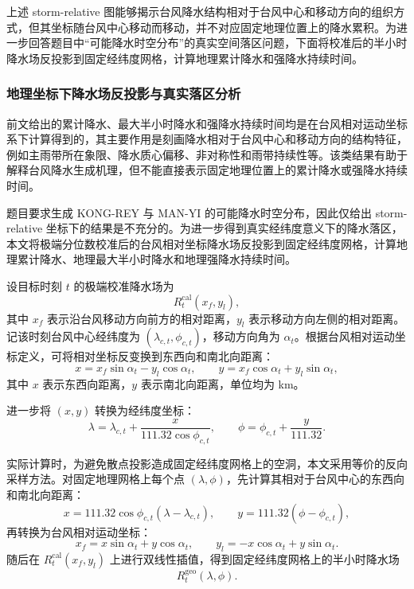 \documentclass[UTF8,a4paper,zihao=5]{ctexart}
\numberwithin{equation}{section}
\numberwithin{figure}{section}
\numberwithin{table}{section}
\begin{document}
上述 storm-relative 图能够揭示台风降水结构相对于台风中心和移动方向的组织方式，但其坐标随台风中心移动而移动，并不对应固定地理位置上的降水累积。为进一步回答题目中“可能降水时空分布”的真实空间落区问题，下面将校准后的半小时降水场反投影到固定经纬度网格，计算地理累计降水和强降水持续时间。

\subsubsection{地理坐标下降水场反投影与真实落区分析}

前文给出的累计降水、最大半小时降水和强降水持续时间均是在台风相对运动坐标系下计算得到的，其主要作用是刻画降水相对于台风中心和移动方向的结构特征，例如主雨带所在象限、降水质心偏移、非对称性和雨带持续性等。该类结果有助于解释台风降水生成机理，但不能直接表示固定地理位置上的累计降水或强降水持续时间。

题目要求生成 KONG-REY 与 MAN-YI 的可能降水时空分布，因此仅给出 storm-relative 坐标下的结果是不充分的。为进一步得到真实经纬度意义下的降水落区，本文将极端分位数校准后的台风相对坐标降水场反投影到固定经纬度网格，计算地理累计降水、地理最大半小时降水和地理强降水持续时间。

设目标时刻 $t$ 的极端校准降水场为
\begin{equation}
R_t^{\mathrm{cal}}(x_f,y_l),
\end{equation}
其中 $x_f$ 表示沿台风移动方向前方的相对距离，$y_l$ 表示移动方向左侧的相对距离。记该时刻台风中心经纬度为 $(\lambda_{c,t},\phi_{c,t})$，移动方向角为 $\alpha_t$。根据台风相对运动坐标定义，可将相对坐标反变换到东西向和南北向距离：
\begin{equation}
x=x_f\sin\alpha_t-y_l\cos\alpha_t,
\qquad
y=x_f\cos\alpha_t+y_l\sin\alpha_t,
\end{equation}
其中 $x$ 表示东西向距离，$y$ 表示南北向距离，单位均为 km。

进一步将 $(x,y)$ 转换为经纬度坐标：
\begin{equation}
\lambda=\lambda_{c,t}
+\frac{x}{111.32\cos\phi_{c,t}},
\qquad
\phi=\phi_{c,t}
+\frac{y}{111.32}.
\end{equation}

实际计算时，为避免散点投影造成固定经纬度网格上的空洞，本文采用等价的反向采样方法。对固定地理网格上每个点 $(\lambda,\phi)$，先计算其相对于台风中心的东西向和南北向距离：
\begin{equation}
x=111.32\cos\phi_{c,t}(\lambda-\lambda_{c,t}),
\qquad
y=111.32(\phi-\phi_{c,t}),
\end{equation}
再转换为台风相对运动坐标：
\begin{equation}
x_f=x\sin\alpha_t+y\cos\alpha_t,
\qquad
y_l=-x\cos\alpha_t+y\sin\alpha_t.
\end{equation}
随后在 $R_t^{\mathrm{cal}}(x_f,y_l)$ 上进行双线性插值，得到固定经纬度网格上的半小时降水场
\begin{equation}
R_t^{\mathrm{geo}}(\lambda,\phi).
\end{equation}
\end{document}
